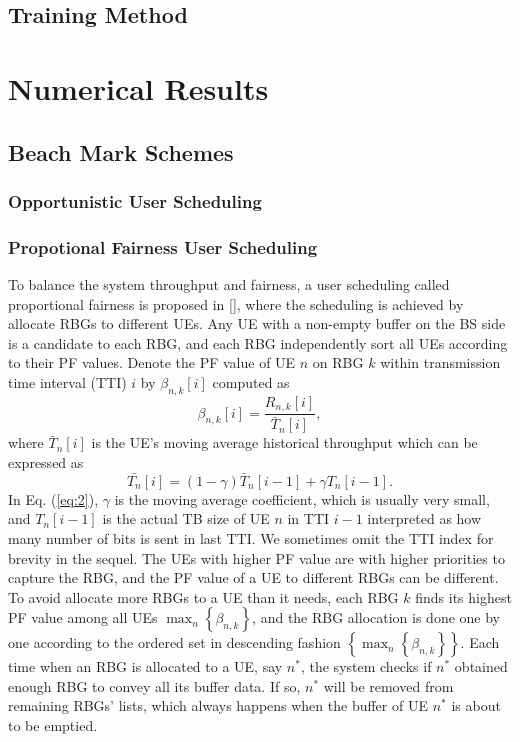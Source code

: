 \documentclass[journal]{IEEEtran}
\begin{document}
\subsection{Training Method}


\section{Numerical Results}

\subsection{Beach Mark Schemes}
\subsubsection{Opportunistic User Scheduling}
\subsubsection{Propotional Fairness User Scheduling}
To balance the system throughput and fairness, a user scheduling called proportional fairness is proposed in [], where the scheduling is achieved by allocate RBGs to different UEs. Any UE with a non-empty buffer on the BS side is a candidate to each RBG, and each RBG independently sort all UEs according to their PF values. Denote the PF value of UE $n$ on RBG $k$ within transmission time interval (TTI) $i$ by $\beta_{n,k}[i]$ computed as
\begin{equation}
\beta_{n,k}[i]=\frac{R_{n,k}[i]}{\bar{T}_n[i]},
\label{eq1}
\end{equation}
where $\bar{T}_n[i]$ is the UE's moving average historical throughput which can be expressed as
\begin{equation}
\bar{T_n}[i]=\left(1-\gamma\right)\bar{T}_n[i-1]+\gamma T_n[i-1].
\label{eq:2}
\end{equation}
In Eq. (\ref{eq:2}), $\gamma$ is the moving average coefficient, which is usually very small, and $T_n[i-1]$ is the actual TB size of UE $n$ in TTI $i-1$ interpreted as how many number of bits is sent in last TTI. We sometimes omit the TTI index for brevity in the sequel. The UEs with higher PF value are with higher priorities to capture the RBG, and the PF value of a UE to different RBGs can be different.  To avoid allocate more RBGs to a UE than it needs, each RBG $k$ finds its highest PF value among all UEs $\mathop{\max}_{n}\left\{\beta_{n,k}\right\}$, and the RBG allocation is done one by one according to the ordered set in descending fashion
$\left\{\mathop{\max}_{n}\left\{\beta_{n,k}\right\}\right\}$. Each time when an RBG is allocated to a UE, say $n^*$, the system checks if $n^*$ obtained enough RBG to convey all its buffer data. If so, $n^*$ will be removed from remaining RBGs' lists, which always happens when the buffer of UE $n^*$ is about to be emptied.
\end{document}
